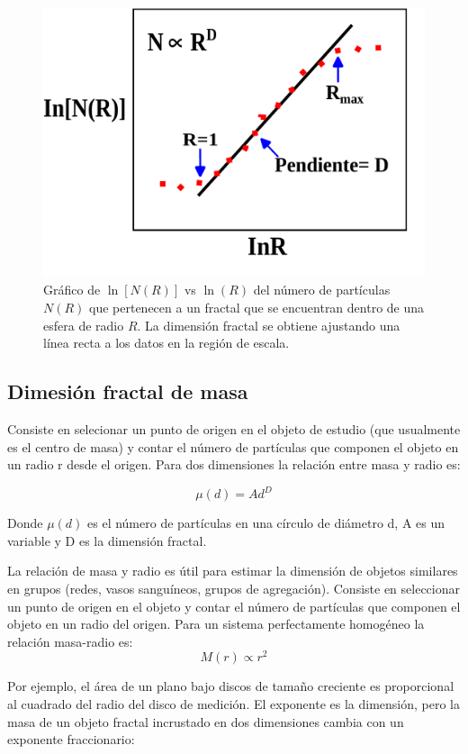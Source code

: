 \begin{figure}[H]
	\begin{center}
		\includegraphics[width=0.5\linewidth]{graphs/dimension-fractal}
		\caption{Gr\'{a}fico de $\ln[N(R)]$ vs $\ln (R)$  del n\'{u}mero de part\'{i}culas $N(R)$ que pertenecen a un fractal que se encuentran dentro de una esfera de radio $R$. La dimensi\'{o}n fractal se obtiene ajustando una l\'{i}nea recta a los datos en la regi\'{o}n de escala.}
		\label{fig:D-Fractal}
	\end{center}
\end{figure}


\subsection{Dimesión fractal de masa}


Consiste en selecionar un punto de
origen en el objeto de estudio (que usualmente es el centro de masa) 
y contar el n\'{u}mero de part\'{i}culas que componen el objeto en 
un radio r desde el origen. Para dos dimensiones la relaci\'{o}n 
entre masa y radio es:

\begin{equation}
	\mu(d) = Ad^D
\end{equation}

Donde $\mu(d)$ es el n\'{u}mero de part\'{i}culas en una c\'{i}rculo de di\'{a}metro d, A es un variable y D es la dimensi\'{o}n fractal\cite{Mustafa1996, Nicolás2020}. 

La relaci\'{o}n de masa y radio es \'{u}til para estimar la dimensi\'{o}n de objetos similares en grupos (redes, vasos sangu\'{i}neos, grupos de agregaci\'{o}n). Consiste en seleccionar un punto de origen en el objeto y contar el n\'{u}mero de part\'{i}culas que componen el objeto en un radio del origen. Para un sistema perfectamente homog\'{e}neo la relaci\'{o}n masa-radio es:
\begin{equation}
	M(r) \propto r^{2}
\end{equation}

Por ejemplo, el \'{a}rea de un plano bajo discos de tamaño creciente es proporcional al cuadrado del radio del disco de medici\'{o}n. El exponente es la dimensi\'{o}n, pero la masa de un objeto fractal incrustado en dos dimensiones cambia con un exponente fraccionario:

